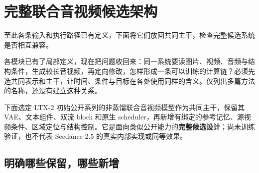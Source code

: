 \chapter{完整联合音视频候选架构}\label{seedance-m19}

至此各条输入和执行路径已有定义，下面将它们放回共同主干，检查完整候选系统是否相互兼容。

各模块已有了局部定义，现在把问题收回来：同一系统要读图片、视频、音频与结构条件，生成较长音视频，再定向修改，怎样形成一条可以训练的计算链？必须先选共同表示和主干，让时间、条件与目标在各处使用同样的含义。仅列出多篇方法的名称，还没有建立这种关系。

下面选定 LTX-2 初始公开系列的非蒸馏联合音视频模型作为共同主干，保留其 VAE、文本组件、双流 block 和原生 scheduler，再新增有绑定的参考记忆、源视频条件、区域定位与结构控制。它是面向类似公开能力的\textbf{完整候选设计}；尚未训练验证，也不代表 Seedance 2.5 的真实内部实现或同等效果。

\section{明确哪些保留，哪些新增}\label{seedance-m19-ux660eux786eux54eaux4e9bux4fddux7559ux54eaux4e9bux65b0ux589e}

